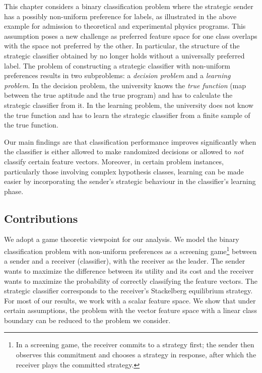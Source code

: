 This chapter considers a binary classification problem where the strategic sender has a possibly non-uniform preference for labels, as illustrated in the above example for admission to theoretical and experimental physics programs. This assumption poses a new challenge as preferred feature space for one class overlaps with the space not preferred by the other. In particular, the structure of the strategic classifier obtained by \cite{hardt2016strategic} no longer holds without a universally preferred label.
The problem of constructing a strategic classifier with non-uniform preferences results in two subproblems: a \textit{decision problem} and a \textit{learning problem}. In the decision problem, the university knows the \textit{true function} (map between the true aptitude and the true program) and has to calculate the strategic classifier from it. In the learning problem, the university does not know the true function and has to learn the strategic classifier from a finite sample of the true function.

Our main findings are that classification performance improves significantly when the classifier is either allowed to make randomized decisions or allowed to \textit{not} classify certain feature vectors. Moreover, in certain problem instances, particularly those involving complex hypothesis classes, learning can be made easier by incorporating the sender's strategic behaviour in the classifier's learning phase.

\subsection{Contributions}

We adopt a game theoretic viewpoint for our analysis. We model the binary classification problem with non-uniform preferences as a screening game\footnote{In a screening game, the receiver commits to a strategy first; the sender then observes this commitment and chooses a strategy in response, after which the receiver plays the committed strategy.} between a sender and a receiver (classifier), with the receiver as the leader. The sender wants to maximize the difference between its utility and its cost and the receiver wants to maximize the probability of correctly classifying the feature vectors. The strategic classifier corresponds to the receiver's Stackelberg equilibrium strategy. For most of our results, we work with a scalar feature space. We show that under certain assumptions, the problem with the vector feature space with a linear class boundary can be reduced to the problem we consider. 

